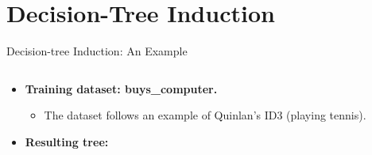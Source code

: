\section{Decision-Tree Induction}

\begin{frame}{Decision-tree Induction: An Example}
	\begin{columns}
		\begin{column}{0.38\textwidth}
			\vspace{-3cm}
			\begin{itemize}
				\item \textbf{Training dataset: buys\_computer.}
				      \begin{itemize}
					      \item The dataset follows an example of Quinlan's ID3 (playing tennis).
				      \end{itemize}
				\item \textbf{Resulting tree:}\\[0.1cm]
				      \centering
				      
			\end{itemize}
		\end{column}
		\begin{column}{0.62\textwidth}
			\small
			
		\end{column}
	\end{columns}
\end{frame}

